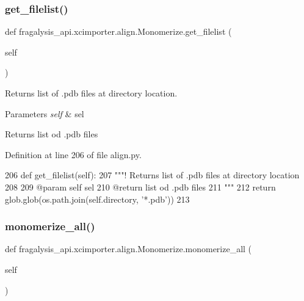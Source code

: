 \subsubsection{\texorpdfstring{get\+\_\+filelist()}{get\_filelist()}}
{\footnotesize\ttfamily def fragalysis\+\_\+api.\+xcimporter.\+align.\+Monomerize.\+get\+\_\+filelist (\begin{DoxyParamCaption}\item[{}]{self }\end{DoxyParamCaption})}



Returns list of .pdb files at directory location. 


\begin{DoxyParams}{Parameters}
{\em self} & sel \\
\hline
\end{DoxyParams}
\begin{DoxyReturn}{Returns}
list od .pdb files 
\end{DoxyReturn}


Definition at line 206 of file align.\+py.


\begin{DoxyCode}
206     \textcolor{keyword}{def }get\_filelist(self):
207         \textcolor{stringliteral}{"""! Returns list of .pdb files at directory location}
208 \textcolor{stringliteral}{    }
209 \textcolor{stringliteral}{        @param self sel}
210 \textcolor{stringliteral}{        @return list od .pdb files}
211 \textcolor{stringliteral}{        """}
212         \textcolor{keywordflow}{return} glob.glob(os.path.join(self.directory, \textcolor{stringliteral}{'*.pdb'}))
213 
\end{DoxyCode}
\mbox{\label{classfragalysis__api_1_1xcimporter_1_1align_1_1_monomerize_a2418993e78b9269ecc5d4222a142261c}} 
\subsubsection{\texorpdfstring{monomerize\+\_\+all()}{monomerize\_all()}}
{\footnotesize\ttfamily def fragalysis\+\_\+api.\+xcimporter.\+align.\+Monomerize.\+monomerize\+\_\+all (\begin{DoxyParamCaption}\item[{}]{self }\end{DoxyParamCaption})}



